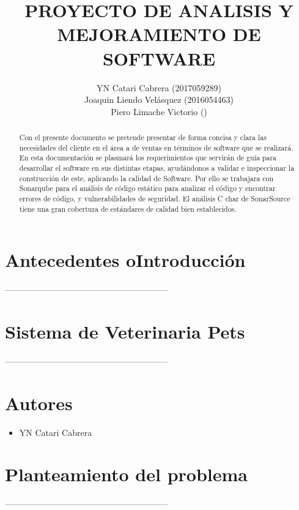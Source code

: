 \documentclass[preprint,12pt]{elsarticle}
\begin{document}
	
	\begin{frontmatter}

		\title{\huge  PROYECTO DE  ANALISIS Y  MEJORAMIENTO DE  SOFTWARE }
		\author{YN Catari Cabrera              (2017059289)\\
		Joaquin Liendo Velásquez (2016054463)\\
		Piero Limache Victorio ()
	}
		
		\address{Tacna, Perú}
		


\begin{abstract}
Con el presente documento se pretende presentar de forma concisa y clara las necesidades del cliente en el área a de ventas en términos de software que se realizará. 
En esta documentación se plasmará los requerimientos que servirán de guía para desarrollar el software en sus distintas etapas, ayudándonos a validar e inspeccionar la construcción de este, aplicando la calidad de Software.
Por ello se trabajara con  Sonarqube para el análisis de código estático
para analizar el código y encontrar errores de código, y vulnerabilidades de seguridad. 
El análisis C char de SonarSource tiene una gran cobertura de estándares de calidad bien establecidos.  
\end{abstract}


\end{frontmatter}
\section{Antecedentes oIntroducción}

---------------------------------------------------------

\section{Sistema de  Veterinaria Pets}
---------------------------------------------------------
\section{Autores}
\begin{itemize}
    \item YN Catari Cabrera
    
    
\end{itemize}
\section{Planteamiento del problema}
---------------------------------------------------------
\end{document}
